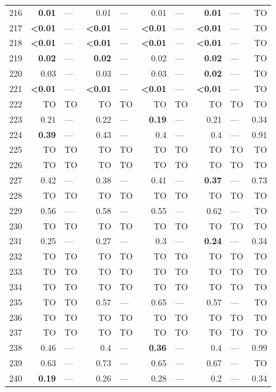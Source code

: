 \begin{longtable}{lr@{\hskip 4pt}l@{\hskip 12pt}r@{\hskip 4pt}l@{\hskip 12pt}r@{\hskip 4pt}l@{\hskip 12pt}r@{\hskip 4pt}l@{\hskip 12pt}r}
216 & \textbf{0.01} & --- & 0.01 & --- & 0.01 & --- & \textbf{0.01} & --- & TO \\
217 & \textbf{<0.01} & --- & \textbf{<0.01} & --- & \textbf{<0.01} & --- & \textbf{<0.01} & --- & TO \\
218 & \textbf{<0.01} & --- & \textbf{<0.01} & --- & \textbf{<0.01} & --- & \textbf{<0.01} & --- & TO \\
219 & \textbf{0.02} & --- & \textbf{0.02} & --- & 0.02 & --- & \textbf{0.02} & --- & TO \\
220 & 0.03 & --- & 0.03 & --- & 0.03 & --- & \textbf{0.02} & --- & TO \\
221 & \textbf{<0.01} & --- & \textbf{<0.01} & --- & \textbf{<0.01} & --- & \textbf{<0.01} & --- & TO \\
222 & TO & TO & TO & TO & TO & TO & TO & TO & TO \\
223 & 0.21 & --- & 0.22 & --- & \textbf{0.19} & --- & 0.21 & --- & 0.34 \\
224 & \textbf{0.39} & --- & 0.43 & --- & 0.4 & --- & 0.4 & --- & 0.91 \\
225 & TO & TO & TO & TO & TO & TO & TO & TO & TO \\
226 & TO & TO & TO & TO & TO & TO & TO & TO & TO \\
227 & 0.42 & --- & 0.38 & --- & 0.41 & --- & \textbf{0.37} & --- & 0.73 \\
228 & TO & TO & TO & TO & TO & TO & TO & TO & TO \\
229 & 0.56 & --- & 0.58 & --- & 0.55 & --- & 0.62 & --- & TO \\
230 & TO & TO & TO & TO & TO & TO & TO & TO & TO \\
231 & 0.25 & --- & 0.27 & --- & 0.3 & --- & \textbf{0.24} & --- & 0.34 \\
232 & TO & TO & TO & TO & TO & TO & TO & TO & TO \\
233 & TO & TO & TO & TO & TO & TO & TO & TO & TO \\
234 & TO & TO & TO & TO & TO & TO & TO & TO & TO \\
235 & TO & TO & 0.57 & --- & 0.65 & --- & 0.57 & --- & TO \\
236 & TO & TO & TO & TO & TO & TO & TO & TO & TO \\
237 & TO & TO & TO & TO & TO & TO & TO & TO & TO \\
238 & 0.46 & --- & 0.4 & --- & \textbf{0.36} & --- & 0.4 & --- & 0.99 \\
239 & 0.63 & --- & 0.73 & --- & 0.65 & --- & 0.67 & --- & TO \\
240 & \textbf{0.19} & --- & 0.26 & --- & 0.28 & --- & 0.2 & --- & 0.34 \\

\end{longtable}
